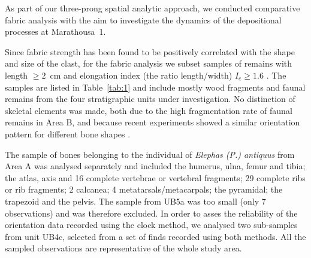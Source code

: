 \documentclass[preprint,authoryear,times]{elsarticle} %
\begin{document}
As part of our three-prong spatial analytic approach, we conducted comparative fabric analysis with the aim to investigate the dynamics of the depositional processes at Marathousa~1.

Since fabric strength has been found to be positively correlated with the shape and size of the clast, for the fabric analysis we subset samples of remains with length $\geq2$~cm and elongation index (the ratio length/width) $I_{e}\geq1.6$ \citep{Lenoble2004}. The samples are listed in Table~\ref{tab:1} and include mostly wood fragments %
and faunal remains from the four stratigraphic units under investigation. %
No distinction of skeletal elements was made, both due to the high fragmentation rate of faunal remains in Area B, and because recent experiments showed a similar orientation pattern for different bone shapes \citep{Dominguez-Rodrigo2012,Dominguez-Rodrigo2013}. %

The sample of bones belonging to the individual of \emph{Elephas (P.) antiquus} from Area A was analysed separately and included the humerus, ulna, femur and tibia; the atlas, axis and 16 complete vertebrae or vertebral fragments; 29 complete ribs or rib fragments; 2 calcanea; 4 metatarsals/metacarpals; the pyramidal; the trapezoid and the pelvis. The sample from UB5a was too small (only 7 observations) and was therefore excluded. In order to asses the reliability of the orientation data recorded using the clock method, we analysed two sub-samples from unit UB4c, selected from a set of finds recorded using both methods. All the sampled observations are representative of the whole study area.

\begin{table}[]
  \caption{List of sampled observations for the fabric analysis.}
  \label{tab:1}
  \vspace{0.1in}
\end{table}
\end{document}
